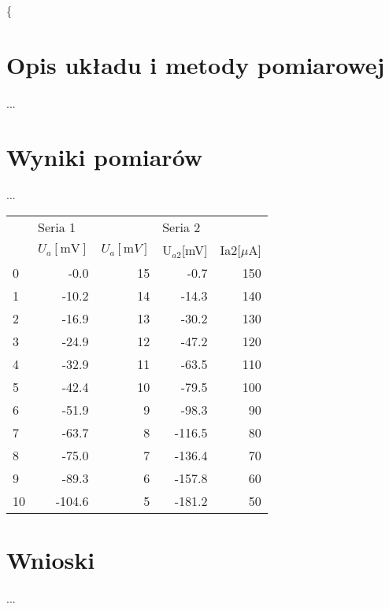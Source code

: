 \documentclass[a4paper,10pt]{article}
\begin{document}
\{ %
\section{Opis układu i metody pomiarowej}

\paragraph{}...

\section{Wyniki pomiarów}...

\begin{tabular}{|l|r|r|r|r|}
\toprule
{} & \multicolumn{2}{l}{Seria 1} & \multicolumn{2}{l}{Seria 2} \\
{} &  $U_{a}[\text{mV}]$ &  $U_{a}[\text{m}V]$ &  U$_{a2}$[mV] &  Ia2[$\mu$A] \\
\midrule
0  &     -0.0 &        15 &     -0.7 &       150 \\
1  &    -10.2 &        14 &    -14.3 &       140 \\
2  &    -16.9 &        13 &    -30.2 &       130 \\
3  &    -24.9 &        12 &    -47.2 &       120 \\
4  &    -32.9 &        11 &    -63.5 &       110 \\
5  &    -42.4 &        10 &    -79.5 &       100 \\
6  &    -51.9 &         9 &    -98.3 &        90 \\
7  &    -63.7 &         8 &   -116.5 &        80 \\
8  &    -75.0 &         7 &   -136.4 &        70 \\
9  &    -89.3 &         6 &   -157.8 &        60 \\
10 &   -104.6 &         5 &   -181.2 &        50 \\
\bottomrule
\end{tabular}
\section{Wnioski}
\paragraph{}...
\end{document}

